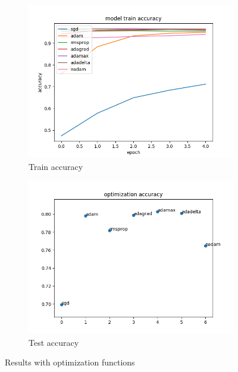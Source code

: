 \documentclass{article}
\begin{document}
\begin{figure}[H]
    \centering
    \begin{subfigure}[b]{0.7\textwidth}
        \includegraphics[width=\textwidth]{2layer20418-512-trainacc.png}
        \caption{Train accuracy}
        \label{fig:tafm}
    \end{subfigure}
    \begin{subfigure}[b]{0.7\textwidth}
        \includegraphics[width=\textwidth]{2layer2048-512-testacc.png}
        \caption{Test accuracy}
        \label{fig:tefm}
    \end{subfigure}
    \caption{Results with optimization functions}\label{fig:rfm}
\end{figure}
\end{document}
